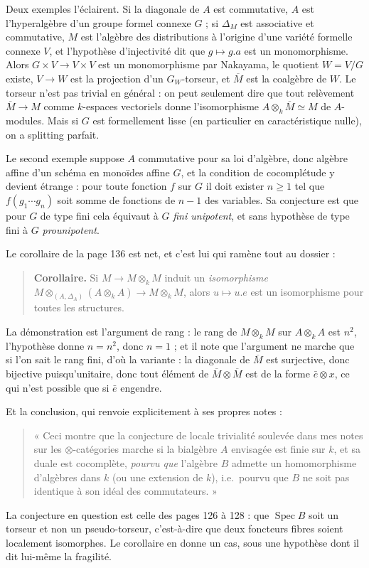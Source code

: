 \documentclass[11pt,a4paper]{article}
\begin{document}
Deux exemples l'éclairent. Si la diagonale de $A$ est commutative, $A$ est
l'hyperalgèbre d'un groupe formel connexe $G$ ; si $\Delta_{M}$ est associative
et commutative, $M$ est l'algèbre des distributions à l'origine d'une variété
formelle connexe $V$, et l'hypothèse d'injectivité dit que $g \mapsto g.a$ est
un monomorphisme. Alors $G \times V \to V \times V$ est un monomorphisme par
Nakayama, le quotient $W = V/G$ existe, $V \to W$ est la projection d'un
$G_{W}$-torseur, et $\overline{M}$ est la coalgèbre de $W$. Le torseur n'est
pas trivial en général : on peut seulement dire que tout relèvement
$\overline{M} \to M$ comme $k$-espaces vectoriels donne l'isomorphisme
$A \otimes_{k} \overline{M} \simeq M$ de $A$-modules. Mais si $G$ est
formellement lisse (en particulier en caractéristique nulle), on a
splitting parfait.

Le second exemple suppose $A$ commutative pour sa loi d'algèbre, donc algèbre
affine d'un schéma en monoïdes affine $G$, et la condition de cocomplétude y
devient étrange : pour toute fonction $f$ sur $G$ il doit exister $n \geqslant
1$ tel que $f(g_{1}\cdots g_{n})$ soit somme de fonctions de $n-1$ des
variables. Sa conjecture est que pour $G$ de type fini cela équivaut à
$G$ \emph{fini unipotent}, et sans hypothèse de type fini à $G$
\emph{prounipotent}.

Le corollaire de la page 136 est net, et c'est lui qui ramène tout au
dossier :
\begin{quote}
\textbf{Corollaire.} Si $M \to M \otimes_{k} M$ induit un \emph{isomorphisme}
$M \otimes_{(A, \Delta_{A})}(A \otimes_{k} A) \to M \otimes_{k} M$, alors
$u \mapsto u.e$ est un isomorphisme pour toutes les structures.
\end{quote}
La démonstration est l'argument de rang : le rang de $M \otimes_{k}M$ sur
$A \otimes_{k}A$ est $n^{2}$, l'hypothèse donne $n = n^{2}$, donc $n = 1$ ;
et il note que l'argument ne marche que si l'on sait le rang fini, d'où la
variante : la diagonale de $\overline{M}$ est surjective, donc bijective
puisqu'unitaire, donc tout élément de $\overline{M} \otimes \overline{M}$ est
de la forme $\bar{e} \otimes x$, ce qui n'est possible que si $\bar{e}$
engendre.

Et la conclusion, qui renvoie explicitement à ses propres notes :
\begin{quote}
« Ceci montre que la conjecture de locale trivialité soulevée dans mes notes
sur les $\otimes$-catégories marche si la bialgèbre $A$ envisagée est finie sur
$k$, et sa duale est cocomplète, \emph{pourvu que} l'algèbre $B$ admette un
homomorphisme d'algèbres dans $k$ (ou une extension de $k$), i.e.\ pourvu que
$B$ ne soit pas identique à son idéal des commutateurs. »
\end{quote}
La conjecture en question est celle des pages 126 à 128 : que
$\operatorname{Spec}B$ soit un torseur et non un pseudo-torseur, c'est-à-dire
que deux foncteurs fibres soient localement isomorphes. Le corollaire en donne
un cas, sous une hypothèse dont il dit lui-même la fragilité.
\end{document}
